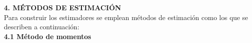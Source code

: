 \documentclass[base=hide,11pt]{elegantbook}
\begin{document}
{%
%			
%			
\textcolor{col4}{\bf \LARGE 4. MÉTODOS DE ESTIMACIÓN}\\

Para construir los estimadores se emplean métodos de estimación como los que se describen a continuación:\\
			
\textcolor{col4}{\bf \large 4.1 Método de momentos}\\

}
\end{document}
